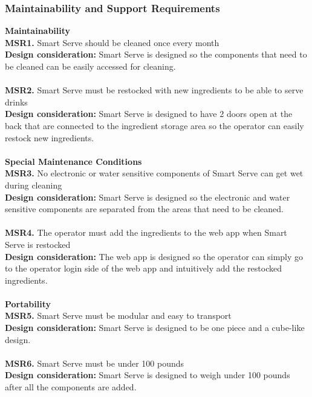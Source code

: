 \documentclass[12pt, titlepage]{article}
\begin{document}
\subsubsection{Maintainability and Support Requirements}
    \textbf{Maintainability}\\
        \noindent\textbf{MSR1.} Smart Serve should be cleaned once every month \\
        \indent\textbf{Design consideration:} Smart Serve is designed so the components that need to be cleaned can be easily accessed for cleaning.\\\\
        \textbf{MSR2.} Smart Serve must be restocked with new ingredients to be able to serve drinks \\
        \indent\textbf{Design consideration:} Smart Serve is designed to have 2 doors open at the back that are connected to the ingredient storage area so the operator can easily restock new ingredients.\\\\
    \textbf{Special Maintenance Conditions} \\
        \noindent\textbf{MSR3.} No electronic or water sensitive components of Smart Serve can get wet during cleaning \\
        \indent\textbf{Design consideration:} Smart Serve is designed so the electronic and water sensitive components are separated from the areas that need to be cleaned.\\\\
        \textbf{MSR4.} The operator must add the ingredients to the web app when Smart Serve is restocked \\
        \indent\textbf{Design consideration:} The web app is designed so the operator can simply go to the operator login side of the web app and intuitively add the restocked ingredients.\\\\
    \textbf{Portability}\\
        \noindent\textbf{MSR5.} Smart Serve must be modular and easy to transport \\
        \indent\textbf{Design consideration:} Smart Serve is designed to be one piece and a cube-like design.\\\\
        \textbf{MSR6.} Smart Serve must be under 100 pounds \\
        \indent\textbf{Design consideration:} Smart Serve is designed to weigh under 100 pounds after all the components are added.
\end{document}
